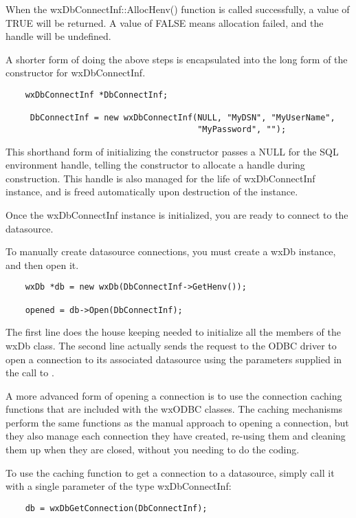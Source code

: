 When the wxDbConnectInf::AllocHenv() function is called successfully, a 
value of TRUE will be returned. A value of FALSE means allocation failed, 
and the handle will be undefined.

A shorter form of doing the above steps is encapsulated into the 
long form of the constructor for wxDbConnectInf.

\begin{verbatim}
    wxDbConnectInf *DbConnectInf;

	 DbConnectInf = new wxDbConnectInf(NULL, "MyDSN", "MyUserName",
	                                   "MyPassword", "");
\end{verbatim}

This shorthand form of initializing the constructor passes a NULL for the SQL 
environment handle, telling the constructor to allocate a handle during 
construction. This handle is also managed for the life of wxDbConnectInf 
instance, and is freed automatically upon destruction of the instance.

Once the wxDbConnectInf instance is initialized, you are ready to 
connect to the datasource.

To manually create datasource connections, you must create a wxDb 
instance, and then open it.

\begin{verbatim}
    wxDb *db = new wxDb(DbConnectInf->GetHenv());

    opened = db->Open(DbConnectInf);
\end{verbatim}

The first line does the house keeping needed to initialize all 
the members of the wxDb class. The second line actually sends the request 
to the ODBC driver to open a connection to its associated datasource using 
the parameters supplied in the call to .

A more advanced form of opening a connection is to use the connection 
caching functions that are included with the wxODBC classes. The caching 
mechanisms perform the same functions as the manual approach to opening a 
connection, but they also manage each connection they have created, 
re-using them and cleaning them up when they are closed, without you 
needing to do the coding.

To use the caching function  to get 
a connection to a datasource, simply call it with a single parameter of the 
type wxDbConnectInf:

\begin{verbatim}
    db = wxDbGetConnection(DbConnectInf);
\end{verbatim}

